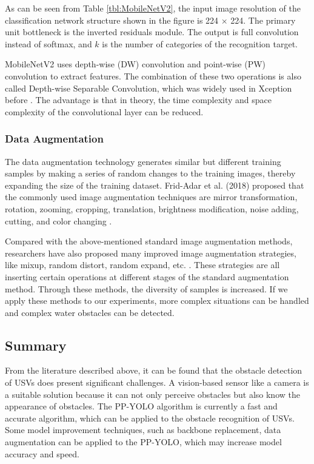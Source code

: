 \documentclass[sensors,article,submit,moreauthors,pdftex]{Definitions/mdpi}
\begin{document}
\begin{paracol}{2}
As can be seen from Table \ref{tbl:MobileNetV2}, the input image resolution of the classification network structure shown in the figure is 224 $\times$ 224. The primary unit bottleneck is the inverted residuals module. The output is full convolution instead of softmax, and $k$ is the number of categories of the recognition target.

MobileNetV2 uses depth-wise (DW) convolution and point-wise (PW) convolution to extract features. The combination of these two operations is also called Depth-wise Separable Convolution, which was widely used in Xception before \cite{sandler2018mobilenetv2}. The advantage is that in theory, the time complexity and space complexity of the convolutional layer can be reduced.

\subsubsection{Data Augmentation}

The data augmentation technology generates similar but different training samples by making a series of random changes to the training images, thereby expanding the size of the training dataset. Frid-Adar et al. (2018) proposed that the commonly used image augmentation techniques are mirror transformation, rotation, zooming, cropping, translation, brightness modification, noise adding, cutting, and color changing \cite{frid2018gan}.

Compared with the above-mentioned standard image augmentation methods, researchers have also proposed many improved image augmentation strategies, like mixup, random distort, random expand, etc. \cite{cubuk2018autoaugment, devries2017improved}. These strategies are all inserting certain operations at different stages of the standard augmentation method. Through these methods, the diversity of samples is increased. If we apply these methods to our experiments, more complex situations can be handled and complex water obstacles can be detected.

\subsection{Summary}

From the literature described above, it can be found that the obstacle detection of USVs does present significant challenges. A vision-based sensor like a camera is a suitable solution because it can not only perceive obstacles but also know the appearance of obstacles. The PP-YOLO algorithm is currently a fast and accurate algorithm, which can be applied to the obstacle recognition of USVs. Some model improvement techniques, such as 
backbone replacement, data augmentation can be applied to the PP-YOLO, which may increase model accuracy and speed.


\end{paracol}
\end{document}
